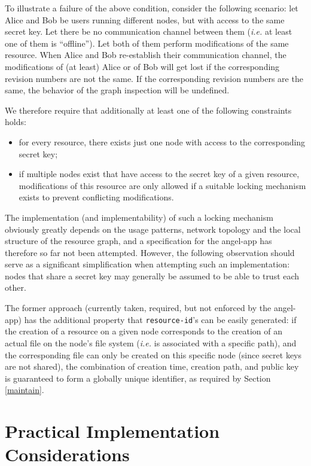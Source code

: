\documentclass[11pt]{article}
\begin{document}
\begin{mainmatter}
To illustrate a failure of the above condition, consider the following scenario: let Alice and Bob be users running different nodes, but with access to the same secret key. Let there be no communication channel between them (\emph{i.e.} at least one of them is ``offline''). Let both of them perform modifications of the same resource. When Alice and Bob re-establish their communication channel, the modifications of (at least) Alice or of Bob will get lost if the corresponding revision numbers are not the same. If the corresponding revision numbers are the same, the behavior of the graph inspection will be undefined. 

We therefore require that additionally at least one of the following constraints holds:
\begin{itemize}
\item for every resource, there exists just one node with access to the corresponding secret key;
\item if multiple nodes exist that have access to the secret key of a given resource, modifications of this resource are only allowed if a suitable locking mechanism exists to prevent conflicting modifications. 
\end{itemize}
The implementation (and implementability) of such a locking mechanism obviously greatly depends on the usage patterns, network topology and the local structure of the resource graph, and a specification for the angel-app has therefore so far not been attempted. However, the following observation should serve as a significant simplification when attempting such an implementation: nodes that share a secret key may generally be assumed to be able to trust each other.

The former approach (currently taken, required, but not enforced by the angel-app) has the additional property that \texttt{resource-id}'s can be easily generated: if the creation of a resource on a given node corresponds to the creation of an actual file on the node's file system (\emph{i.e.} is associated with a specific path), and the corresponding file can only be created on this specific node (since secret keys are not shared), the combination of creation time, creation path, and public key is guaranteed to form a globally unique identifier, as required by Section \ref{maintain}.

\section{Practical Implementation Considerations}


\end{mainmatter}
\end{document}
